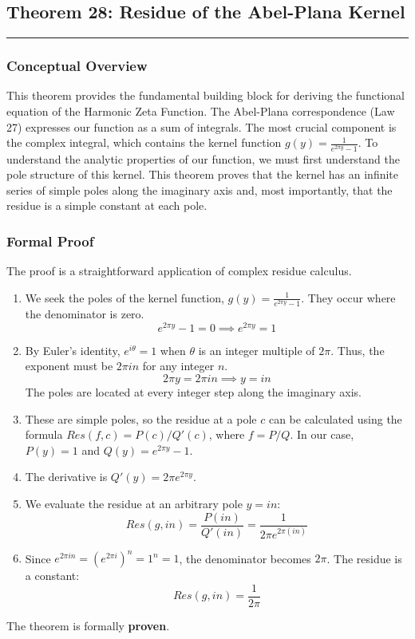 \subsection*{Theorem 28: Residue of the Abel-Plana Kernel}
\hrule
\vspace{0.5cm}

\subsubsection*{Conceptual Overview}
This theorem provides the fundamental building block for deriving the functional equation of the Harmonic Zeta Function. The Abel-Plana correspondence (Law 27) expresses our function as a sum of integrals. The most crucial component is the complex integral, which contains the kernel function $g(y) = \frac{1}{e^{2\pi y}-1}$. To understand the analytic properties of our function, we must first understand the pole structure of this kernel. This theorem proves that the kernel has an infinite series of simple poles along the imaginary axis and, most importantly, that the residue is a simple constant at each pole.

\subsubsection*{Formal Proof}
The proof is a straightforward application of complex residue calculus.
\begin{enumerate}
    \item We seek the poles of the kernel function, $g(y) = \frac{1}{e^{2\pi y}-1}$. They occur where the denominator is zero.
    $$ e^{2\pi y}-1 = 0 \implies e^{2\pi y} = 1 $$
    \item By Euler's identity, $e^{i\theta} = 1$ when $\theta$ is an integer multiple of $2\pi$. Thus, the exponent must be $2\pi i n$ for any integer $n$.
    $$ 2\pi y = 2\pi i n \implies y = in $$
    The poles are located at every integer step along the imaginary axis.
    \item These are simple poles, so the residue at a pole $c$ can be calculated using the formula $Res(f,c) = P(c)/Q'(c)$, where $f=P/Q$. In our case, $P(y)=1$ and $Q(y)=e^{2\pi y}-1$.
    \item The derivative is $Q'(y) = 2\pi e^{2\pi y}$.
    \item We evaluate the residue at an arbitrary pole $y=in$:
    $$ Res(g, in) = \frac{P(in)}{Q'(in)} = \frac{1}{2\pi e^{2\pi(in)}} $$
    \item Since $e^{2\pi in} = (e^{2\pi i})^n = 1^n = 1$, the denominator becomes $2\pi$. The residue is a constant:
    $$ Res(g, in) = \frac{1}{2\pi} $$
\end{enumerate}
The theorem is formally \textbf{proven}.

